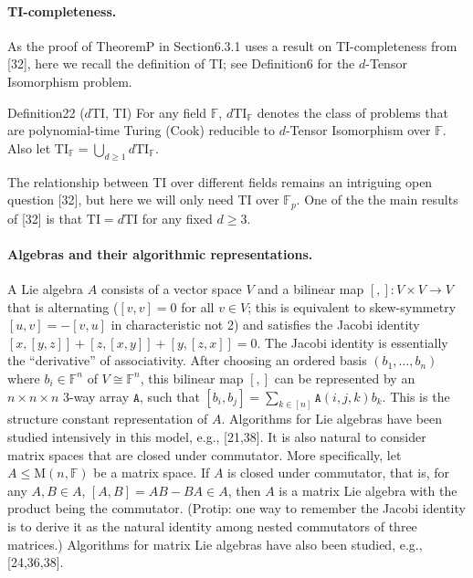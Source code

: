 \paragraph{TI-completeness.} As the proof of TheoremP in Section6.3.1 uses a result on TI-completeness from [32], here we recall the definition of TI; see Definition6 for the $d$-Tensor Isomorphism problem.
\begin{authorclaim}{Definition22 ($d$TI, TI)}
For any field $\mathbb F$, $d\mathrm{TI}_{\mathbb F}$ denotes the class of problems that are polynomial-time Turing (Cook) reducible to $d$-Tensor Isomorphism over $\mathbb F$. Also let $\mathrm{TI}_{\mathbb F}=\bigcup_{d\ge1}d\mathrm{TI}_{\mathbb F}$.
\end{authorclaim}
The relationship between TI over different fields remains an intriguing open question [32], but here we will only need TI over $\mathbb F_p$. One of the the main results of [32] is that $\mathrm{TI}=d\mathrm{TI}$ for any fixed $d\ge3$.
\paragraph{Algebras and their algorithmic representations.} A Lie algebra $A$ consists of a vector space $V$ and a bilinear map $[,]:V\times V\to V$ that is alternating ($[v,v]=0$ for all $v\in V$; this is equivalent to skew-symmetry $[u,v]=-[v,u]$ in characteristic not 2) and satisfies the Jacobi identity $[x,[y,z]]+[z,[x,y]]+[y,[z,x]]=0$. The Jacobi identity is essentially the ``derivative'' of associativity.
After choosing an ordered basis $(b_1,\ldots,b_n)$ where $b_i\in\mathbb F^n$ of $V\cong\mathbb F^n$, this bilinear map $[,]$ can be represented by an $n\times n\times n$ 3-way array $\mathtt A$, such that $[b_i,b_j]=\sum_{k\in[n]}\mathtt A(i,j,k)b_k$. This is the structure constant representation of $A$. Algorithms for Lie algebras have been studied intensively in this model, e.g., [21,38].
It is also natural to consider matrix spaces that are closed under commutator. More specifically, let $A\le\mathrm M(n,\mathbb F)$ be a matrix space. If $A$ is closed under commutator, that is, for any $A,B\in A$, $[A,B]=AB-BA\in A$, then $A$ is a matrix Lie algebra with the product being the commutator. (Protip: one way to remember the Jacobi identity is to derive it as the natural identity among nested commutators of three matrices.) Algorithms for matrix Lie algebras have also been studied, e.g., [24,36,38].
